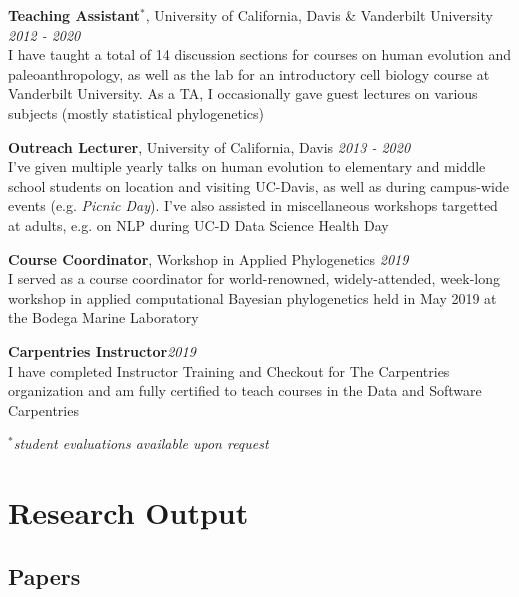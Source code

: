 \documentclass[12pt]{article}
\begin{document}
\textbf{Teaching Assistant$^{*}$}, University of California, Davis \& Vanderbilt University \hfill \emph{2012  - 2020}\\
I have taught a total of 14 discussion sections for courses on human evolution and paleoanthropology, as well as the lab for an introductory cell biology course at Vanderbilt University. As a TA, I occasionally gave guest lectures on various subjects (mostly statistical phylogenetics)

\textbf{Outreach Lecturer}, University of California, Davis \hfill \emph{2013  - 2020}\\
I've given multiple yearly talks on human evolution to elementary and middle school students on location and visiting UC-Davis, as well as during campus-wide events (e.g. \emph{Picnic Day}). I've also assisted in miscellaneous workshops targetted at adults, e.g. on NLP during UC-D Data Science Health Day

\textbf{Course Coordinator}, Workshop in Applied Phylogenetics \hfill \emph{2019}\\
I served as a course coordinator for world-renowned, widely-attended, week-long workshop in applied computational Bayesian phylogenetics held in May 2019 at the Bodega Marine Laboratory

\textbf{Carpentries Instructor}\hfill \emph{2019}\\
I have completed Instructor Training and Checkout for The Carpentries organization and am fully certified to teach courses in the Data and Software Carpentries

$^{*}$\emph{student evaluations available upon request}

\section{Research Output}

\subsection{Papers}
\end{document}

